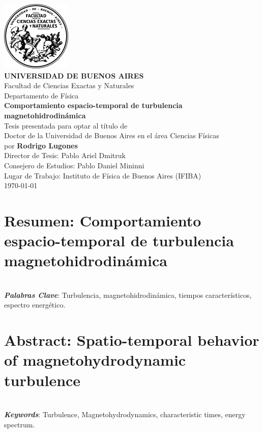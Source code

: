 \documentclass[12pt]{book}
\begin{document}
\frontmatter
\thispagestyle{empty}
\begin{center}
\large{
\includegraphics[width=0.25\textwidth]{logo.png}\vspace{1cm}\\
\textbf{UNIVERSIDAD DE BUENOS AIRES}\\
Facultad de Ciencias Exactas y Naturales\\
Departamento de Física\vspace{1.5cm}\\
\textbf{\LARGE Comportamiento espacio-temporal de turbulencia magnetohidrodinámica}
\vspace{0.5cm}\\
Tesis presentada para optar al título de \\
Doctor de la Universidad de Buenos Aires en el área Ciencias Físicas\\
por \textbf{Rodrigo Lugones} \vspace{1.5cm}\\
Director de Tesis: Pablo Ariel Dmitruk\\
Consejero de Estudios: Pablo Daniel Mininni\\
Lugar de Trabajo: Instituto de Física de Buenos Aires (IFIBA)
\vspace{1.5cm}\\
\today
}
\end{center}

\newpage

\section*{Resumen: Comportamiento espacio-temporal de turbulencia \\magnetohidrodinámica}
\\
\noindent\emph{\textbf{Palabras Clave}}: Turbulencia,
magnetohidrodinámica, tiempos característicos, espectro energético.

\newpage
\section*{Abstract: Spatio-temporal behavior of magnetohydrodynamic turbulence}
\\
\noindent\emph{\textbf{Keywords}}: Turbulence, Magnetohydrodynamics,
characteristic times, energy spectrum.
\end{document}
